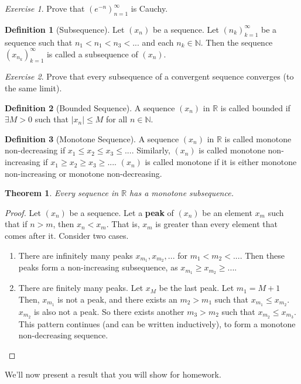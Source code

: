 \documentclass[11pt]{article}
\newcommand{\R}{\ensuremath{\mathbb R}}
\newcommand{\N}{\ensuremath{\mathbb N}}
\newcommand{\E}{\exists}
\theoremstyle{plain}
\newtheorem{thm}{Theorem}[section]
\theoremstyle{definition}
\newtheorem{defi}{Definition}[section]
\theoremstyle{remark}
\newtheorem{exc}{Exercise}[section]
\begin{document}
\begin{exc}
    Prove that $(e^{-n})_{n=1}^\infty$ is Cauchy.
\end{exc}
\begin{defi}[Subsequence]
    Let $(x_n)$ be a sequence. Let $(n_k)_{k=1}^{\infty}$ be a sequence such that $n_1 < n_1 < n_3 < ...$ and each $n_k \in \N$. Then the sequence $(x_{n_k})_{k=1}^\infty$ is called a subsequence of $(x_n)$.
\end{defi}
\begin{exc}
    Prove that every subsequence of a convergent sequence converges (to the same limit).
\end{exc}
\begin{defi}[Bounded Sequence]
    A sequence $(x_n)$ in $\R$ is called bounded if $\E M > 0$ such that $|x_n| \leq M$ for all $n \in \N$.
\end{defi}
\begin{defi}[Monotone Sequence]
    A sequence $(x_n)$ in $\R$ is called monotone non-decreasing if $x_1 \leq x_2 \leq x_3 \leq ...$. Similarly, $(x_n)$ is called monotone non-increasing if $x_1 \geq x_2 \geq x_3 \geq ...$. $(x_n)$ is called monotone if it is either monotone non-increasing or monotone non-decreasing.
\end{defi}
\begin{thm}
    Every sequence in $\R$ has a monotone subsequence.
    \label{thm:mono}
\end{thm}
\begin{proof}
    Let $(x_n)$ be a sequence. Let a {\bf peak} of $(x_n)$ be an element $x_m$ such that if $n > m$, then $x_n < x_m$. That is, $x_m$ is greater than every element that comes after it. Consider two cases. 
    \begin{enumerate}
        \item There are infinitely many peaks $x_{m_1}, x_{m_2}, ...$ for $m_1 < m_2 < ...$. Then these peaks form a non-increasing subsequence, as $x_{m_1} \geq x_{m_2} \geq ...$.
        \item There are finitely many peaks. Let $x_M$ be the last peak. Let $m_1 = M + 1$ Then, $x_{m_1}$ is not a peak, and there exists an $m_2 > m_1$ such that $x_{m_1} \leq x_{m_2}$. $x_{m_2}$ is also not a peak. So there exists another $m_3 > m_2$ such that $x_{m_2} \leq x_{m_3}$. This pattern continues (and can be written inductively), to form a monotone non-decreasing sequence.
    \end{enumerate}
\end{proof}
We'll now present a result that you will show for homework.
\end{document}
